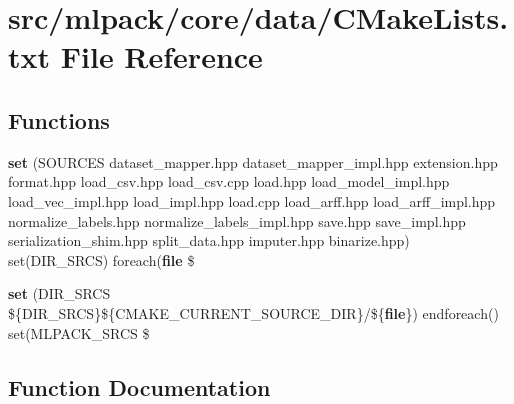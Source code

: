 \section{src/mlpack/core/data/\+C\+Make\+Lists.txt File Reference}
\label{core_2data_2CMakeLists_8txt}
\subsection*{Functions}
\begin{DoxyCompactItemize}
\item 
{\bf set} (S\+O\+U\+R\+C\+ES dataset\+\_\+mapper.\+hpp dataset\+\_\+mapper\+\_\+impl.\+hpp extension.\+hpp format.\+hpp load\+\_\+csv.\+hpp load\+\_\+csv.\+cpp load.\+hpp load\+\_\+model\+\_\+impl.\+hpp load\+\_\+vec\+\_\+impl.\+hpp load\+\_\+impl.\+hpp load.\+cpp load\+\_\+arff.\+hpp load\+\_\+arff\+\_\+impl.\+hpp normalize\+\_\+labels.\+hpp normalize\+\_\+labels\+\_\+impl.\+hpp save.\+hpp save\+\_\+impl.\+hpp serialization\+\_\+shim.\+hpp split\+\_\+data.\+hpp imputer.\+hpp binarize.\+hpp) set(D\+I\+R\+\_\+\+S\+R\+CS) foreach({\bf file} \$
\item 
{\bf set} (D\+I\+R\+\_\+\+S\+R\+CS \$\{D\+I\+R\+\_\+\+S\+R\+CS\}\$\{C\+M\+A\+K\+E\+\_\+\+C\+U\+R\+R\+E\+N\+T\+\_\+\+S\+O\+U\+R\+C\+E\+\_\+\+D\+IR\}/\$\{{\bf file}\}) endforeach() set(M\+L\+P\+A\+C\+K\+\_\+\+S\+R\+CS \$
\end{DoxyCompactItemize}


\subsection{Function Documentation}

